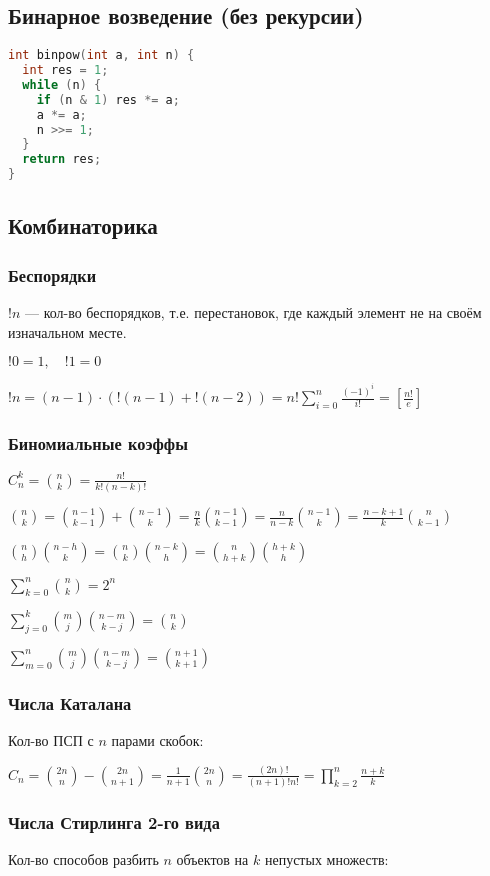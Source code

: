 \documentclass[10pt,a4paper,landscape,twosided]{extarticle}
\begin{document}
\begin{multicols}{3}
\subsection{Бинарное возведение (без рекурсии)}
\begin{lstlisting}[language=C++]
int binpow(int a, int n) {
  int res = 1;
  while (n) {
    if (n & 1) res *= a;
    a *= a;
    n >>= 1;
  }
  return res;
}
\end{lstlisting}

\subsection{Комбинаторика}

\subsubsection{Беспорядки}
$!n$ — кол-во беспорядков, т.е. перестановок, где каждый элемент не на своём изначальном месте.

$!0=1, \quad !1=0$

$!n=(n-1)\cdot(!(n-1)+!(n-2))=n!\sum\limits_{i=0}^n\frac{(-1)^i}{i!}=\left[\frac{n!}{e}\right]$

\subsubsection{Биномиальные коэффы}
$C_n^k=\binom{n}{k}=\frac{n!}{k!(n-k)!}$

$\binom{n}{k}=\binom{n-1}{k-1}+\binom{n-1}{k}=\frac{n}{k}\binom{n-1}{k-1}=\frac{n}{n-k}\binom{n-1}{k}=\frac{n-k+1}{k}\binom{n}{k-1}$

$\binom{n}{h}\binom{n-h}{k}=\binom{n}{k}\binom{n-k}{h}=\binom{n}{h+k}\binom{h+k}{h}$

$\sum\limits_{k=0}^n\binom{n}{k}=2^n$

$\sum\limits_{j=0}^k\binom{m}{j}\binom{n-m}{k-j}=\binom{n}{k}$

$\sum\limits_{m=0}^n\binom{m}{j}\binom{n-m}{k-j}=\binom{n+1}{k+1}$

\subsubsection{Числа Каталана}
Кол-во ПСП с $n$ парами скобок:

$C_n=\binom{2n}n-\binom{2n}{n+1}=\frac1{n+1}\binom{2n}n=\frac{(2n)!}{(n+1)!n!}=\prod\limits_{k=2}^n\frac{n+k}{k}$

\subsubsection{Числа Стирлинга 2-го вида}
Кол-во способов разбить $n$ объектов на $k$ непустых множеств:


\end{multicols}
\end{document}
